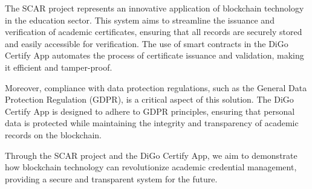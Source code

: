 The SCAR project represents an innovative application of blockchain technology in the education sector. This system aims to streamline the issuance and verification of academic certificates, ensuring that all records are securely stored and easily accessible for verification. The use of smart contracts in the DiGo Certify App automates the process of certificate issuance and validation, making it efficient and tamper-proof.

Moreover, compliance with data protection regulations, such as the General Data Protection Regulation (GDPR), is a critical aspect of this solution. The DiGo Certify App is designed to adhere to GDPR principles, ensuring that personal data is protected while maintaining the integrity and transparency of academic records on the blockchain.

Through the SCAR project and the DiGo Certify App, we aim to demonstrate how blockchain technology can revolutionize academic credential management, providing a secure and transparent system for the future.